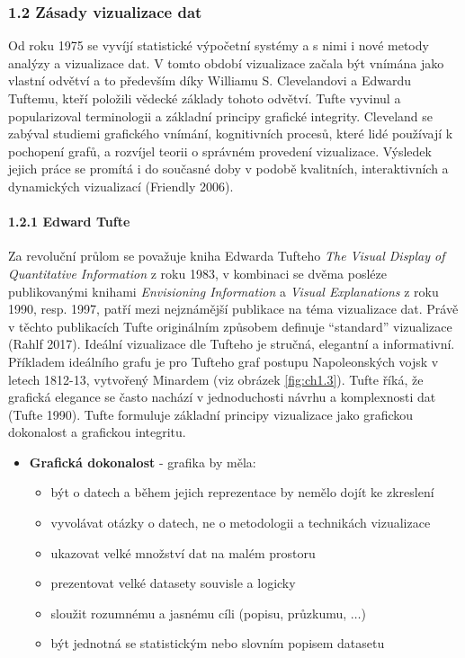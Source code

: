 \documentclass[12pt,]{article}
\providecommand{\tightlist}{%
  \setlength{\itemsep}{0pt}\setlength{\parskip}{0pt}}
\let\oldparagraph\paragraph
\renewcommand{\paragraph}[1]{\oldparagraph{#1}\mbox{}}
\begin{document}
\subsubsection{1.2 Zásady vizualizace dat}\label{zasady-vizualizace-dat}

\qquad Od roku 1975 se vyvíjí statistické výpočetní systémy a s nimi i
nové metody analýzy a vizualizace dat. V tomto období vizualizace začala
být vnímána jako vlastní odvětví a to především díky Williamu S.
Clevelandovi a Edwardu Tuftemu, kteří položili vědecké základy tohoto
odvětví. Tufte vyvinul a popularizoval terminologii a základní principy
grafické integrity. Cleveland se zabýval studiemi grafického vnímání,
kognitivních procesů, které lidé používají k pochopení grafů, a rozvíjel
teorii o správném provedení vizualizace. Výsledek jejich práce se
promítá i do současné doby v podobě kvalitních, interaktivních a
dynamických vizualizací (Friendly 2006).

\hypertarget{tufte}{\paragraph{1.2.1 Edward Tufte}\label{tufte}}

\qquad Za revoluční průlom se považuje kniha Edwarda Tufteho \emph{The
Visual Display of Quantitative Information} z roku 1983, v kombinaci se
dvěma posléze publikovanými knihami \emph{Envisioning Information} a
\emph{Visual Explanations} z roku 1990, resp. 1997, patří mezi
nejznámější publikace na téma vizualizace dat. Právě v těchto
publikacích Tufte originálním způsobem definuje \enquote{standard}
vizualizace (Rahlf 2017). Ideální vizualizace dle Tufteho je stručná,
elegantní a informativní. Příkladem ideálního grafu je pro Tufteho graf
postupu Napoleonských vojsk v letech 1812-13, vytvořený Minardem (viz
obrázek \ref{fig:ch1.3}). Tufte říká, že grafická elegance se často
nachází v jednoduchosti návrhu a komplexnosti dat (Tufte 1990). Tufte
formuluje základní principy vizualizace jako grafickou dokonalost a
grafickou integritu.

\begin{itemize}
\tightlist
\item
  \textbf{Grafická dokonalost} - grafika by měla:

  \begin{itemize}
  \tightlist
  \item
    být o datech a během jejich reprezentace by nemělo dojít ke
    zkreslení
  \item
    vyvolávat otázky o datech, ne o metodologii a technikách vizualizace
  \item
    ukazovat velké množství dat na malém prostoru
  \item
    prezentovat velké datasety souvisle a logicky
  \item
    sloužit rozumnému a jasnému cíli (popisu, průzkumu, \(\dots\))
  \item
    být jednotná se statistickým nebo slovním popisem datasetu
  \end{itemize}
\end{itemize}
\end{document}
